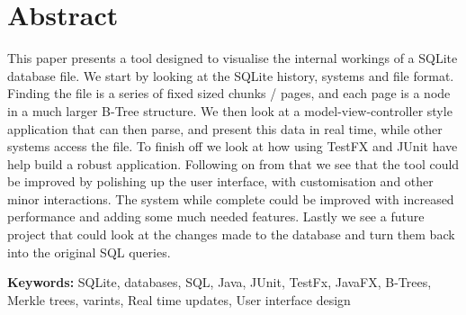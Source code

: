 \section*{\centering Abstract}

This paper presents a tool designed to visualise the internal workings of a SQLite database file. We start by looking at the SQLite history, systems and file format. Finding the file is a series of fixed sized chunks / pages, and each page is a node in a much larger B-Tree structure. We then look at a model-view-controller style application that can then parse, and present this data in real time, while other systems access the file. To finish off we look at how using TestFX and JUnit have help build a robust application. Following on from that we see that the tool could be improved by polishing up the user interface, with customisation and other minor interactions. The system while complete could be improved with increased performance and adding some much needed features. Lastly we see a future project that could look at the changes made to the database and turn them back into the original SQL queries. 

\vspace{1.5cm}

\textbf{Keywords:} SQLite, databases, SQL, Java, JUnit, TestFx, JavaFX, B-Trees, Merkle trees, varints, Real time updates, User interface design